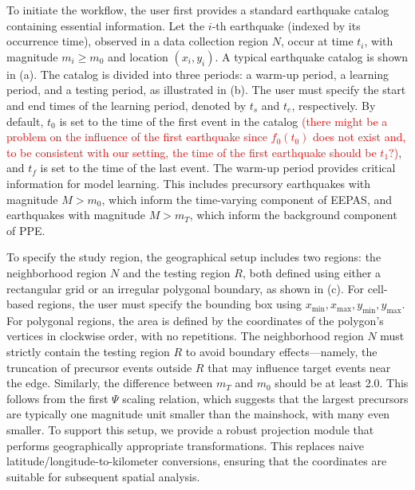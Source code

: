 \documentclass[extra,mreferee]{gji}
\theoremstyle{lemma}
\begin{document}
To initiate the workflow, the user first provides a standard earthquake catalog containing essential information. Let the $i$-th earthquake (indexed by its occurrence time), observed in a data collection region $N$, occur at time $t_i$, with magnitude $m_i \geq m_0$ and location $(x_i, y_i)$. A typical earthquake catalog is shown in (a). The catalog is divided into three periods: a warm-up period, a learning period, and a testing period, as illustrated in (b). The user must specify the start and end times of the learning period, denoted by $t_s$ and $t_e$, respectively. By default, $t_0$ is set to the time of the first event in the catalog \textcolor{red}{(there might be a problem on the influence of the first earthquake since $f_0(t_0)$ does not exist and, to be consistent with our setting, the time of the first earthquake should be $t_1$?)}, and $t_f$ is set to the time of the last event. The warm-up period provides critical information for model learning. This includes precursory earthquakes with magnitude $M > m_0$, which inform the time-varying component of EEPAS, and earthquakes with magnitude $M > m_T$, which inform the background component of PPE.

To specify the study region, the geographical setup includes two regions: the neighborhood region $N$ and the testing region $R$, both defined using either a rectangular grid or an irregular polygonal boundary, as shown in (c). For cell-based regions, the user must specify the bounding box using $x_{\min}, x_{\max}, y_{\min}, y_{\max}$. For polygonal regions, the area is defined by the coordinates of the polygon’s vertices in clockwise order, with no repetitions. The neighborhood region $N$ must strictly contain the testing region $R$ to avoid boundary effects—namely, the truncation of precursor events outside $R$ that may influence target events near the edge. Similarly, the difference between $m_T$ and $m_0$ should be at least 2.0. This follows from the first $\Psi$ scaling relation, which suggests that the largest precursors are typically one magnitude unit smaller than the mainshock, with many even smaller. To support this setup, we provide a robust projection module that performs geographically appropriate transformations. This replaces naive latitude/longitude-to-kilometer conversions, ensuring that the coordinates are suitable for subsequent spatial analysis.
\end{document}
